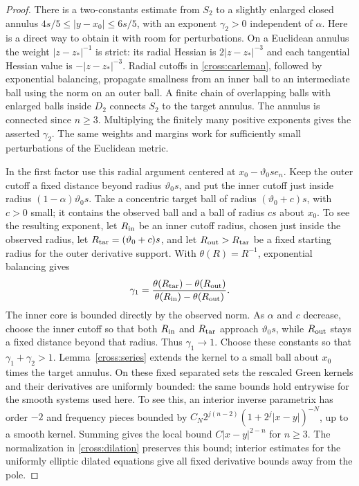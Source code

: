 \begin{proof}
There is a two-constants estimate from $S_2$ to a slightly enlarged
closed annulus $4s/5\le|y-x_0|\le6s/5$, with an exponent
$\gamma_2>0$ independent of $\alpha$.  Here is a direct way to obtain
it with room for perturbations.  On a Euclidean annulus the weight
$|z-z_*|^{-1}$ is strict: its radial Hessian is
$2|z-z_*|^{-3}$ and each tangential Hessian value is
$-|z-z_*|^{-3}$.  Radial cutoffs in
\eqref{cross:carleman}, followed by exponential balancing, propagate
smallness from an inner ball to an intermediate ball using the norm
on an outer ball.  A finite chain of overlapping balls with enlarged
balls inside $D_2$ connects $S_2$ to the target annulus.  The annulus
is connected since $n\ge3$.  Multiplying the finitely many positive
exponents gives the asserted $\gamma_2$.  The same weights and margins
work for sufficiently small perturbations of the Euclidean metric.

In the first factor use this radial argument centered at
$x_0-\vartheta_0se_n$.  Keep the outer cutoff a fixed distance beyond radius
$\vartheta_0s$, and put the inner cutoff just inside radius
$(1-\alpha)\vartheta_0s$.  Take a concentric target ball of radius
$(\vartheta_0+c)s$, with $c>0$ small; it contains the observed ball and
a ball of radius $cs$ about $x_0$.
To see the resulting exponent, let $R_{\rm in}$ be an inner cutoff
radius, chosen just inside the observed radius, let
$R_{\rm tar}=(\vartheta_0+c)s$, and let $R_{\rm out}>R_{\rm tar}$ be
a fixed starting radius for the outer derivative support.  With
$\theta(R)=R^{-1}$, exponential balancing gives
\[
 \gamma_1=
 \frac{\theta(R_{\rm tar})-\theta(R_{\rm out})}
      {\theta(R_{\rm in})-\theta(R_{\rm out})}.
\]
The inner core is bounded directly by the observed norm.  As $\alpha$
and $c$ decrease, choose the inner cutoff so that both
$R_{\rm in}$ and $R_{\rm tar}$ approach $\vartheta_0s$, while
$R_{\rm out}$ stays a fixed distance beyond that radius.  Thus
$\gamma_1\to1$.  Choose these constants so that
$\gamma_1+\gamma_2>1$.
Lemma~\ref{cross:series} extends the kernel to a small ball about
$x_0$ times the target annulus.  On these fixed separated sets the
rescaled Green kernels and their derivatives are uniformly bounded:
the same bounds hold entrywise for the smooth systems used here.  To see
this, an interior inverse parametrix has order $-2$ and frequency pieces
bounded by $C_N2^{j(n-2)}(1+2^j|x-y|)^{-N}$, up to a smooth kernel.
Summing gives the local bound $C|x-y|^{2-n}$ for $n\ge3$.
The normalization in \eqref{cross:dilation} preserves this bound;
interior estimates for the uniformly elliptic dilated equations give all
fixed derivative bounds away from the pole.


\end{proof}
